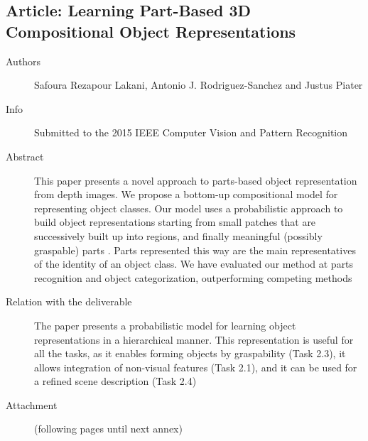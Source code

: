 \documentclass[a4paper,11pt,pdf]{pacmanreport}
\begin{document}
\subsection{Article: Learning Part-Based 3D Compositional Object Representations} \label{ann:cvpr} 
\begin{description}
	\item[Authors] Safoura Rezapour Lakani, Antonio J. Rodriguez-Sanchez and Justus Piater
	\item[Info] Submitted to the 2015 IEEE Computer Vision and Pattern Recognition
	\item[Abstract] This paper presents a novel approach to parts-based object representation from depth images. We propose a bottom-up compositional model for representing object classes. Our model uses a probabilistic approach to build object representations starting from small patches that are successively built up into regions, and finally meaningful (possibly graspable) parts . Parts represented this way are the main representatives of the identity of an object class. We have evaluated our method at parts recognition and object categorization, outperforming competing methods
	\item[Relation with the deliverable] The paper presents a probabilistic model for learning object representations in a hierarchical manner. This representation is useful for all the tasks, as it enables forming objects by graspability (Task 2.3), it allows integration of non-visual features (Task 2.1), and it can be used for a refined scene description (Task 2.4)
    \item[Attachment] (following pages until next annex) 
\end{description}

\end{document}
